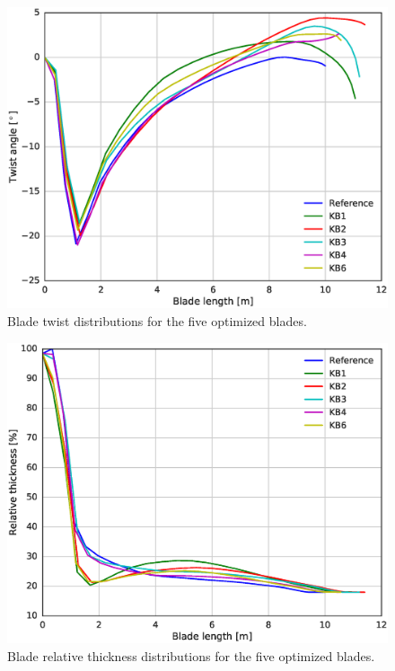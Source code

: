 \begin{figure}[!ht]
\begin{center}
	\includegraphics[width=.85\linewidth]{figures/KBcomp_twist.eps}
\end{center}
\caption{Blade twist distributions for the five optimized blades.}
\label{fig:twist}
\end{figure}

\begin{figure}[!ht]
\begin{center}
	\includegraphics[width=.85\linewidth]{figures/KBcomp_rthick.eps}
\end{center}
\caption{Blade relative thickness distributions for the five optimized blades.}
\label{fig:rthick}
\end{figure}


